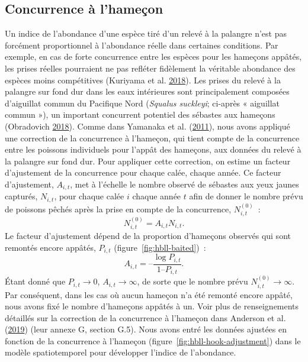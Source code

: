 \documentclass[french,11pt]{book}
\begin{document}
\hypertarget{sec:hbll-hook-competition}{%
\subsection{Concurrence à l'hameçon}\label{sec:hbll-hook-competition}}

Un indice de l'abondance d'une espèce tiré d'un relevé à la palangre n'est pas forcément proportionnel à l'abondance réelle dans certaines conditions. Par exemple, en cas de forte concurrence entre les espèces pour les hameçons appâtés, les prises réelles pourraient ne pas refléter fidèlement la véritable abondance des espèces moins compétitives (Kuriyama et al. \protect\hyperlink{ref-kuriyama2018}{2018}). Les prises du relevé à la palangre sur fond dur dans les eaux intérieures sont principalement composées d'aiguillat commun du Pacifique Nord (\emph{Squalus suckleyi}; ci-après « aiguillat commun »), un important concurrent potentiel des sébastes aux hameçons (Obradovich \protect\hyperlink{ref-obradovich2018}{2018}). Comme dans Yamanaka et al. (\protect\hyperlink{ref-yamanaka2011}{2011}), nous avons appliqué une correction de la concurrence à l'hameçon, qui tient compte de la concurrence entre les poissons individuels pour l'appât des hameçons, aux données du relevé à la palangre sur fond dur. Pour appliquer cette correction, on estime un facteur d'ajustement de la concurrence pour chaque calée, chaque année. Ce facteur d'ajustement, \(A_{i,t}\), met à l'échelle le nombre observé de sébastes aux yeux jaunes capturés, \(N_{i,t}\), pour chaque calée \(i\) chaque année \(t\) afin de donner le nombre prévu de poissons pêchés après la prise en compte de la concurrence, \(N_{i,t}^{(0)}\)~:
\begin{equation}
N_{i,t}^{(0)} = A_{i,t} N_{i,t}.
\label{eq:Nit}
\end{equation}
Le facteur d'ajustement dépend de la proportion d'hameçons observés qui sont remontés encore appâtés, \(P_{i,t}\) (figure~\ref{fig:hbll-baited})~:
\begin{equation}
A_{i,t} = – \frac{ \log P_{i,t}}{1 – P_{i,t}}.
\label{eq:hbll-hook-adjustment}
\end{equation}
Étant donné que \(P_{i,t} \rightarrow 0\), \(A_{i,t} \rightarrow \infty\), de sorte que le nombre prévu \(N_{i,t}^{(0)} \rightarrow \infty\). Par conséquent, dans les cas où aucun hameçon n'a été remonté encore appâté, nous avons fixé le nombre d'hameçons appâtés à un. Voir plus de renseignements détaillés sur la correction de la concurrence à l'hameçon dans Anderson et al. (\protect\hyperlink{ref-anderson2019synopsis}{2019}) (leur annexe G, section G.5). Nous avons entré les données ajustées en fonction de la concurrence à l'hameçon (figure~\ref{fig:hbll-hook-adjustment}) dans le modèle spatiotemporel pour développer l'indice de l'abondance.
\end{document}
